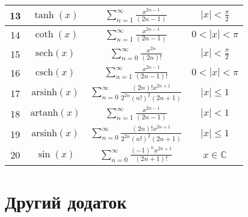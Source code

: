 \documentclass[14pt,a4paper,twoside]{article}
\begin{document}
\begin{table}[h!]
\begin{tabular}{|c|c||c||c|}
			\hline
			13 & \( \tanh(x) \) & \( \displaystyle\sum_{n=1}^{\infty} \frac{x^{2n-1}}{(2n-1)} \) & \( |x| < \frac{\pi}{2} \) \\
			\hline
			14 & \( \coth(x) \) & \( \displaystyle\sum_{n=1}^{\infty} \frac{x^{2n-1}}{(2n-1)} \) & \( 0 < |x| < \pi \) \\
			\hline
			15 & \( \text{sech}(x) \) & \( \displaystyle\sum_{n=0}^{\infty} \frac{x^{2n}}{(2n)!} \) & \( |x| < \frac{\pi}{2} \) \\
			\hline
			16 & \( \text{csch}(x) \) & \( \displaystyle\sum_{n=1}^{\infty} \frac{x^{2n-1}}{(2n-1)!} \) & \( 0 < |x| < \pi \) \\
			\hline
			17 & \( \text{arsinh}(x) \) & \( \displaystyle\sum_{n=0}^{\infty} \frac{(2n)! x^{2n+1}}{2^{2n} (n!)^2 (2n+1)} \) & \( |x| \leq 1 \) \\
			\hline
			18 & \( \text{artanh}(x) \) & \( \displaystyle\sum_{n=1}^{\infty} \frac{x^{2n-1}}{(2n-1)} \) & \( |x| < 1 \) \\
			\hline
			19 & \( \text{arsinh}(x) \) & \( \displaystyle\sum_{n=0}^{\infty} \frac{(2n)! x^{2n+1}}{2^{2n} (n!)^2 (2n+1)} \) & \( |x| \leq 1 \) \\
			\hline
			20 & \( \sin(x) \) & \( \displaystyle\sum_{n=0}^{\infty} \frac{(-1)^n x^{2n+1}}{(2n+1)!} \) & \( x \in \mathbb{C} \) \\
			\hline
		\end{tabular}
	\end{table}
	
	\newpage	
	\section{Другий додаток}\label{sec:appendix2}
	
\end{document}
